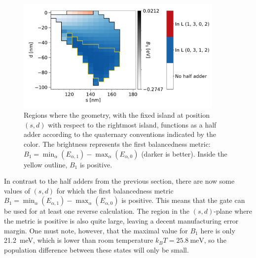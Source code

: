 \documentclass[11pt,a4paper,english]{article}
\begin{document}
\begin{figure}
    \centering
    \includegraphics[width=0.9\textwidth]{Figures/half_adder/sweep/000006_d-s/tableside(d0-100_5,s100-180_5)_balanced1.pdf}
    \caption{Regions where the geometry, with the fixed island at position $(s, d)$ with respect to the rightmost island, functions as a half adder according to the quaternary conventions indicated by the color. The brightness represents the first balancedness metric: $B_1 = \min_\alpha(E_{\alpha,1}) - \max_\alpha(E_{\alpha,0})$ (darker is better). Inside the yellow outline, $B_1$ is positive.} 
    \label{fig:HalfAdder_000006_sweepnew_d-s_balanced1}
\end{figure} %
In contrast to the half adders from the previous section, there are now some values of $(s,d)$ for which the first balancedness metric $B_1 = \min_\alpha(E_{\alpha,1}) - \max_\alpha(E_{\alpha,0})$ is positive. This means that the gate can be used for at least one reverse calculation. The region in the $(s,d)$-plane where the metric is positive is also quite large, leaving a decent manufacturing error margin. One must note, however, that the maximal value for $B_1$ here is only \SI{21.2}{\milli\electronvolt}, which is lower than room temperature $k_B T = \SI{25.8}{\milli\electronvolt}$, so the population difference between these states will only be small. \par
\end{document}
